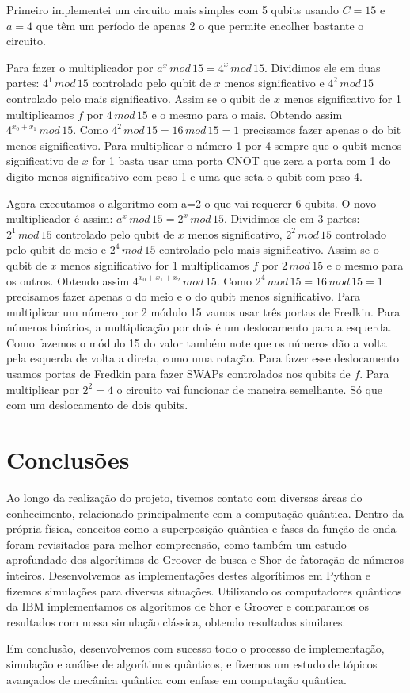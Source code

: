 \documentclass[12pt,a4paper]{article}
\begin{document}
Primeiro implementei um circuito mais simples com 5 qubits usando $C=15$ e $a=4$ que têm um período de apenas 2 o que permite encolher bastante o circuito.

Para fazer o multiplicador por $a^x\, mod\, 15=4^x\, mod\, 15$. Dividimos ele em duas partes: $4^1\, mod\, 15$ controlado pelo qubit de $x$ menos significativo e $4^2\, mod\, 15$ controlado pelo mais significativo. Assim se o qubit de $x$ menos significativo for 1 multiplicamos $f$ por $4\,mod\,15$ e o mesmo para o mais. Obtendo assim $4^{x_0+x_1}\, mod\, 15$. Como $4^2\,mod\,15=16\,mod\,15=1$ precisamos fazer apenas o do bit menos significativo. Para multiplicar o número 1 por 4 sempre que o qubit menos significativo de $x$ for 1 basta usar uma porta CNOT que zera a porta com 1 do digito menos significativo com peso 1 e uma que seta o qubit com peso 4.

Agora executamos o algoritmo com a=2 o que vai requerer 6 qubits.
O novo multiplicador é assim: $a^x\, mod\, 15=2^x\, mod\, 15$. Dividimos ele em 3 partes: $2^1\, mod\, 15$ controlado pelo qubit de $x$ menos significativo, $2^2\, mod\, 15$ controlado pelo qubit do meio e $2^4\, mod\, 15$ controlado pelo mais significativo. Assim se o qubit de $x$ menos significativo for 1 multiplicamos $f$ por $2\,mod\,15$ e o mesmo para os outros. Obtendo assim $4^{x_0+x_1+x_2}\, mod\, 15$. Como $2^4\,mod\,15=16\,mod\,15=1$ precisamos fazer apenas o do meio e o do qubit menos significativo. Para multiplicar um número por 2 módulo 15 vamos usar três portas de Fredkin. 
Para números binários, a multiplicação por dois é um deslocamento para a esquerda. Como fazemos o módulo 15 do valor também note que os números dão a volta pela esquerda de volta a direta, como uma rotação. Para fazer esse deslocamento usamos portas de Fredkin para fazer SWAPs controlados nos qubits de $f$. Para multiplicar por $2^2=4$ o circuito vai funcionar de maneira semelhante. Só que com um deslocamento de dois qubits.

\section{Conclusões}
Ao longo da realização do projeto, tivemos contato com diversas áreas do conhecimento, relacionado principalmente com a computação quântica. Dentro da própria física, conceitos como a superposição quântica e fases da função de onda foram revisitados para melhor compreensão, como também um estudo aprofundado dos algorítimos de Groover de busca e Shor de fatoração de números inteiros. Desenvolvemos as implementações destes algorítimos em Python e fizemos simulações para diversas situações. Utilizando os computadores quânticos da IBM implementamos os algoritmos de Shor e Groover e comparamos os resultados com nossa simulação clássica, obtendo resultados similares.

Em conclusão, desenvolvemos com sucesso todo o processo de implementação, simulação e análise de algorítimos quânticos, e fizemos um estudo de tópicos avançados de mecânica quântica com enfase em computação quântica.

\singlespacing %
\setlength{\bibsep}{0.0pt}

\printbibliography
\end{document}
